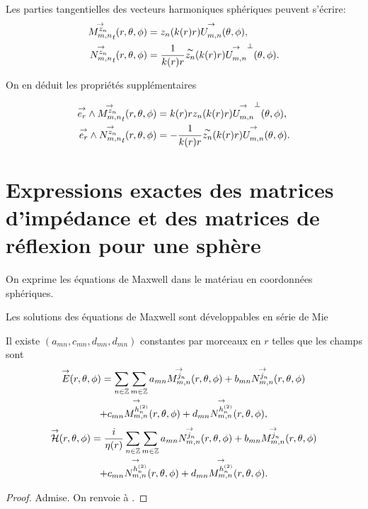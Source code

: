     \begin{prop}
        Les parties tangentielles des vecteurs harmoniques sphériques peuvent s'écrire:
        \begin{align*}
          \Mmn[z_n]_t(\rtp) &= z_n(k(r)r)\Umn(\tp),
          \\
          \Nmn[z_n]_t(\rtp) &= \frac{1}{k(r)r}\tilde{z_n}(k(r)r)\Umn^\perp(\tp).
        \end{align*}
    \end{prop}

    On en déduit les propriétés supplémentaires
    \begin{prop}
        \label{prop:Mmn_Nmn_vect}
        \begin{align*}
          \vect{e_r} \pvect \Mmn[z_n]_t(\rtp) &= k(r)rz_n(k(r)r)\Umn^\perp(\tp),
          \\
          \vect{e_r} \pvect \Nmn[z_n]_t(\rtp) &= -\frac{1}{k(r)r}\tilde{z_n}(k(r)r)\Umn(\tp).
        \end{align*}
    \end{prop}

\section[Opérateur de Calderón pour une sphère]{Expressions exactes des matrices d'impédance et des matrices de réflexion pour une sphère}

    \begin{figure}[!hbt]
        \centering
        \begin{tikzpicture}
              
        \end{tikzpicture}
    \end{figure}

    On exprime les équations de Maxwell dans le matériau en coordonnées sphériques.

    Les solutions des équations de Maxwell sont développables en série de Mie
    \begin{prop}
        Il existe \((a_{mn},c_{mn},d_{mn},d_{mn})\) constantes par morceaux en \(r\) telles que les champs sont
        \begin{multline*}
            \vE(\rtp) = \sum_{n\in\ZZ}\sum_{m\in\ZZ} a_{mn} \Mmn[j_n](\rtp) + b_{mn} \Nmn[j_n](\rtp)
            \\
            + c_{mn} \Mmn[h^{(2)}_n](\rtp) + d_{mn} \Nmn[h^{(2)}_n](\rtp),
        \end{multline*}
        \begin{multline*}
            \vH(\rtp) = \frac{i}{\eta(r)}\sum_{n\in\ZZ}\sum_{m\in\ZZ} a_{mn} \Nmn[j_n](\rtp) + b_{mn} \Mmn[j_n](\rtp)
            \\
            + c_{mn} \Nmn[h^{(2)}_n](\rtp) + d_{mn} \Mmn[h^{(2)}_n](\rtp).
        \end{multline*}
    \end{prop}
    \begin{proof}
        Admise. On renvoie à \cite{cheng_spectral_1993}.
    \end{proof}

